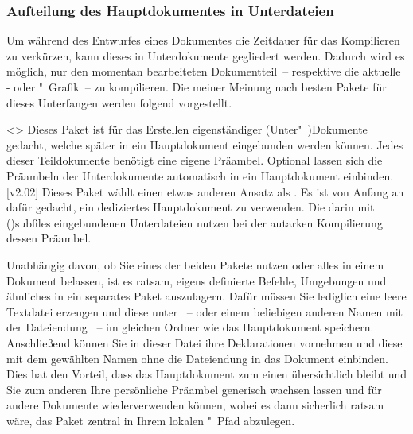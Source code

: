 \subsubsection{%
  Aufteilung des Hauptdokumentes in Unterdateien%
}

Um während des Entwurfes eines Dokumentes die Zeitdauer für das Kompilieren zu 
verkürzen, kann dieses in Unterdokumente gegliedert werden. Dadurch wird es 
möglich, nur den momentan bearbeiteten Dokumentteil~-- respektive die aktuelle 
- oder "~Grafik~-- zu kompilieren. Die 
meiner Meinung nach besten Pakete für dieses Unterfangen werden folgend 
vorgestellt.

\begin{DeclarePackages}
<>
  Dieses Paket ist für das Erstellen eigenständiger (Unter"~)Dokumente gedacht, 
  welche später in ein Hauptdokument eingebunden werden können. Jedes dieser 
  Teildokumente benötigt eine eigene Präambel. Optional lassen sich die 
  Präambeln der Unterdokumente automatisch in ein Hauptdokument einbinden.
[v2.02]
  Dieses Paket wählt einen etwas anderen Ansatz als . Es 
  ist von Anfang an dafür gedacht, ein dediziertes Hauptdokument zu verwenden. 
  Die darin mit \Macro(){subfiles} eingebundenen 
  Unterdateien nutzen bei der autarken Kompilierung dessen Präambel.
\end{DeclarePackages}

Unabhängig davon, ob Sie eines der beiden Pakete nutzen oder alles in einem 
Dokument belassen, ist es ratsam, eigens definierte Befehle, Umgebungen und 
ähnliches in ein separates Paket auszulagern. Dafür müssen Sie lediglich eine 
leere Textdatei erzeugen und diese unter ~-- oder einem 
beliebigen anderen Namen mit der Dateiendung ~-- im gleichen Ordner 
wie das Hauptdokument speichern. Anschließend können Sie in dieser Datei ihre 
Deklarationen vornehmen und diese mit dem gewählten Namen ohne die Dateiendung
 in das Dokument einbinden. Dies hat 
den Vorteil, dass das Hauptdokument zum einen übersichtlich bleibt und Sie zum 
anderen Ihre persönliche Präambel generisch wachsen lassen und für andere 
Dokumente wiederverwenden können, wobei es dann sicherlich ratsam wäre, das 
Paket zentral in Ihrem lokalen "~Pfad abzulegen. 



